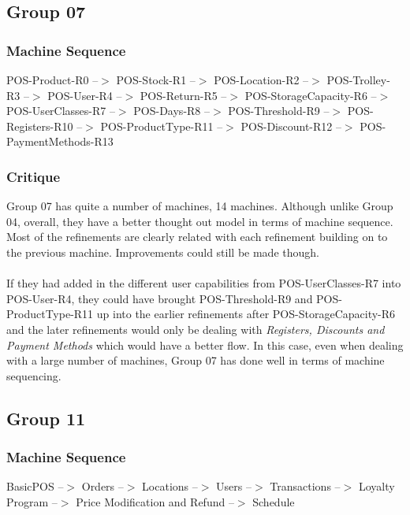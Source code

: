 \subsection{Group 07}
\label{group07}

\subsubsection{Machine Sequence}
\label{machinesequence}

POS-Product-R0 --$>$ POS-Stock-R1 --$>$ POS-Location-R2 --$>$ POS-Trolley-R3 --$>$ POS-User-R4 --$>$ POS-Return-R5 --$>$ POS-StorageCapacity-R6 --$>$ POS-UserClasses-R7 --$>$ POS-Days-R8 --$>$ POS-Threshold-R9 --$>$ POS-Registers-R10 --$>$ POS-ProductType-R11 --$>$ POS-Discount-R12 --$>$ POS-PaymentMethods-R13

\subsubsection{Critique}
\label{critique}

Group 07 has quite a number of machines, 14 machines. Although unlike Group 04, overall, they have a better thought out model in terms of machine sequence. Most of the refinements are clearly related with each refinement building on to the previous machine. Improvements could still be made though.  \\ \\  If they had added in the different user capabilities from POS-UserClasses-R7 into POS-User-R4, they could have brought POS-Threshold-R9 and POS-ProductType-R11 up into the earlier refinements after POS-StorageCapacity-R6 and the later refinements would only be dealing with \emph{Registers, Discounts and Payment Methods} which would have a better flow. In this case, even when dealing with a large number of machines, Group 07 has done well in terms of machine sequencing.

\subsection{Group 11}
\label{group11}

\subsubsection{Machine Sequence}
\label{machinesequence}

BasicPOS --$>$ Orders --$>$ Locations --$>$ Users --$>$ Transactions --$>$ Loyalty Program --$>$ Price Modification and Refund --$>$ Schedule

